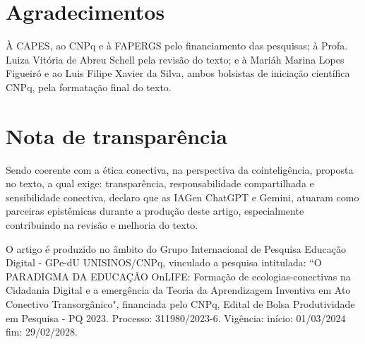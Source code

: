 \documentclass[portuguese]{textolivre}
\begin{document}
\section{Agradecimentos}
À CAPES, ao CNPq e à FAPERGS pelo financiamento das pesquisas; à Profa. Luiza Vitória de Abreu Schell pela revisão do texto; e à Mariáh Marina Lopes Figueiró e ao Luis Filipe Xavier da Silva, ambos bolsistas de iniciação científica CNPq, pela formatação final do texto.

\printbibliography\label{sec-bib}

\section*{\fontsize{10}{12}\selectfont Nota de transparência}
Sendo coerente com a ética conectiva, na perspectiva da cointeligência, proposta no texto, a qual exige: transparência, responsabilidade compartilhada e sensibilidade conectiva, declaro que as IAGen ChatGPT e Gemini, atuaram como parceiras epistêmicas durante a produção deste artigo, especialmente contribuindo na revisão e melhoria do texto.

\begin{funding}
O artigo é produzido no âmbito do Grupo Internacional de Pesquisa Educação Digital - GPe-dU UNISINOS/CNPq, vinculado a pesquisa intitulada: “O PARADIGMA DA EDUCAÇÃO OnLIFE: Formação de ecologias-conectivas na Cidadania Digital e a emergência da Teoria da Aprendizagem Inventiva em Ato Conectivo Transorgânico", financiada pelo CNPq, Edital de Bolsa Produtividade em Pesquisa - PQ 2023. Processo: 311980/2023-6. Vigência: início: 01/03/2024 fim: 29/02/2028.
\end{funding}

\begin{dataavailability}
\end{dataavailability}
\end{document}
